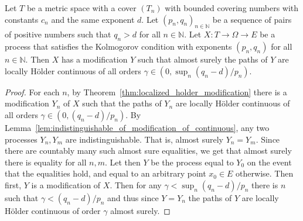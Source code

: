 \begin{theorem}\label{thm:localized_holder_modification_sup}
  \leanok
Let $T$ be a metric space with a cover $(T_n)$ with bounded covering numbers with constants $c_n$ and the same exponent $d$.
Let $(p_n, q_n)_{n \in \mathbb{N}}$ be a sequence of pairs of positive numbers such that $q_n > d$ for all $n \in \mathbb{N}$.
Let $X : T \to \Omega \to E$ be a process that satisfies the Kolmogorov condition with exponents $(p_n, q_n)$ for all $n \in \mathbb{N}$.
Then $X$ has a modification $Y$ such that almost surely the paths of $Y$ are locally Hölder continuous of all orders $\gamma \in (0, \sup_n (q_n - d)/p_n)$.
\end{theorem}

\begin{proof}\leanok
For each $n$, by Theorem~\ref{thm:localized_holder_modification} there is a modification $Y_n$ of $X$ such that the paths of $Y_n$ are locally Hölder continuous of all orders $\gamma \in (0, (q_n - d)/p_n)$.
By Lemma~\ref{lem:indistinguishable_of_modification_of_continuous}, any two processes $Y_n, Y_m$ are indistinguishable.
That is, almost surely $Y_n = Y_m$.
Since there are countably many such almost sure equalities, we get that almost surely there is equality for all $n, m$.
Let then $Y$ be the process equal to $Y_0$ on the event that the equalities hold, and equal to an arbitrary point $x_0 \in E$ otherwise.
Then first, $Y$ is a modification of $X$.
Then for any $\gamma < \sup_n (q_n - d)/p_n$ there is $n$ such that $\gamma < (q_n - d)/p_n$ and thus since $Y = Y_n$ the paths of $Y$ are locally Hölder continuous of order $\gamma$ almost surely.
\end{proof}
